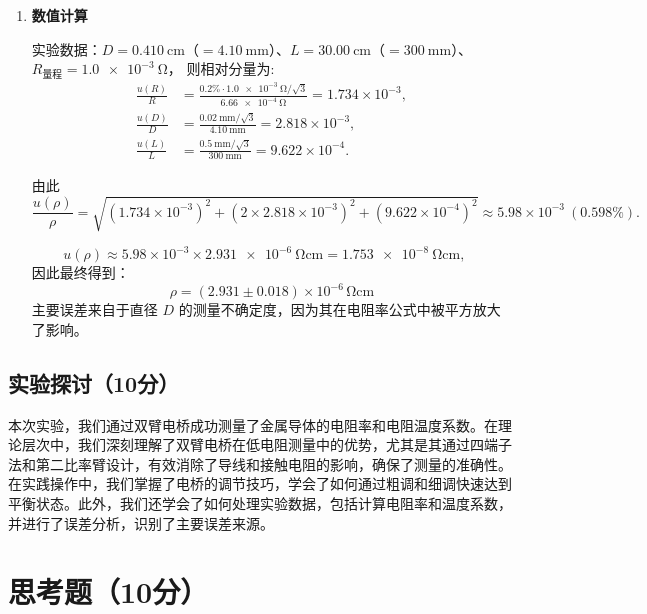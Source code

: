 \documentclass[]{../../templates/Report}%
\begin{document}
\begin{fullreportonly}
\begin{enumerate}
\item \textbf{数值计算}

实验数据：$D=\SI{0.410}{\centi\meter}$（$=\SI{4.10}{\milli\meter}$）、$L=\SI{30.00}{\centi\meter}$（$=\SI{300}{\milli\meter}$）、$R_{\text{量程}}=\SI{1.0e-3}{\ohm}$，
则相对分量为:
\begin{align}
    \frac{u(R)}{R} &= \frac{0.2\%\cdot \SI{1.0e-3}{\ohm} /\sqrt{3}}{\SI{6.66e-4}{\ohm}} = 1.734\times10^{-3},\\
    \frac{u(D)}{D} &= \frac{\SI{0.02}{\milli\meter}/\sqrt{3}}{\SI{4.10}{\milli\meter}} = 2.818\times10^{-3},\\
    \frac{u(L)}{L} &= \frac{\SI{0.5}{\milli\meter}/\sqrt{3}}{\SI{300}{\milli\meter}} = 9.622\times10^{-4}.
\end{align}

由此
\begin{equation}
    \frac{u(\rho)}{\rho}
    = \sqrt{(1.734\times10^{-3})^2 + (2\times2.818\times10^{-3})^2 + (9.622\times10^{-4})^2}
    \approx 5.98\times10^{-3}\ (0.598\%).
\end{equation}

\begin{equation}
    u(\rho) \approx 5.98\times10^{-3}\times \SI{2.931e-6}{\ohm\centi\meter}
    = \SI{1.753e-8}{\ohm\centi\meter},\quad
\end{equation}
因此最终得到：
\begin{equation}
    \boxed{\rho = (2.931 \pm 0.018)\times10^{-6}\,\si{\ohm\centi\meter}}
\end{equation}
主要误差来自于直径 $D$ 的测量不确定度，因为其在电阻率公式中被平方放大了影响。
\end{enumerate}



\subsection{实验探讨（10分）}
本次实验，我们通过双臂电桥成功测量了金属导体的电阻率和电阻温度系数。在理论层次中，我们深刻理解了双臂电桥在低电阻测量中的优势，尤其是其通过四端子法和第二比率臂设计，有效消除了导线和接触电阻的影响，确保了测量的准确性。
在实践操作中，我们掌握了电桥的调节技巧，学会了如何通过粗调和细调快速达到平衡状态。此外，我们还学会了如何处理实验数据，包括计算电阻率和温度系数，并进行了误差分析，识别了主要误差来源。

\section{思考题（10分）}

\end{fullreportonly}
\end{document}
